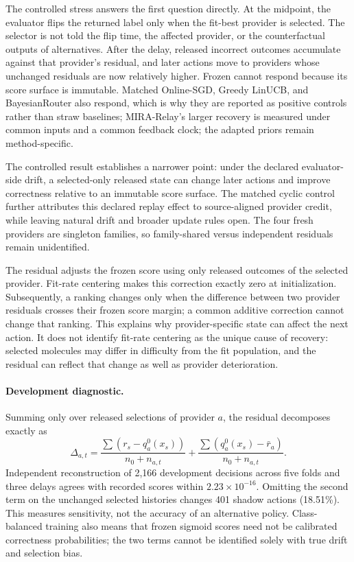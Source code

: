 \documentclass[sigconf,anonymous]{aamas}
\begin{document}
The controlled stress answers the first question directly. At the midpoint, the evaluator flips the returned label only when the fit-best provider is selected. The selector is not told the flip time, the affected provider, or the counterfactual outputs of alternatives. After the delay, released incorrect outcomes accumulate against that provider's residual, and later actions move to providers whose unchanged residuals are now relatively higher. Frozen cannot respond because its score surface is immutable. Matched Online-SGD, Greedy LinUCB, and BayesianRouter also respond, which is why they are reported as positive controls rather than straw baselines; MIRA-Relay's larger recovery is measured under common inputs and a common feedback clock; the adapted priors remain method-specific.

The controlled result establishes a narrower point: under the declared evaluator-side drift, a selected-only released state can change later actions and improve correctness relative to an immutable score surface. The matched cyclic control further attributes this declared replay effect to source-aligned provider credit, while leaving natural drift and broader update rules open. The four fresh providers are singleton families, so family-shared versus independent residuals remain unidentified.

The residual adjusts the frozen score using only released outcomes of the selected provider. Fit-rate centering makes this correction exactly zero at initialization. Subsequently, a ranking changes only when the difference between two provider residuals crosses their frozen score margin; a common additive correction cannot change that ranking. This explains why provider-specific state can affect the next action. It does not identify fit-rate centering as the unique cause of recovery: selected molecules may differ in difficulty from the fit population, and the residual can reflect that change as well as provider deterioration.

\paragraph{Development diagnostic.}
Summing only over released selections of provider $a$, the residual decomposes exactly as
\begin{equation}
\Delta_{a,t}=\frac{\sum(r_s-q_a^0(x_s))}{n_0+n_{a,t}}
            +\frac{\sum(q_a^0(x_s)-\bar r_a)}{n_0+n_{a,t}}.
\end{equation}
Independent reconstruction of 2,166 development decisions across five folds and three delays agrees with recorded scores within $2.23\times10^{-16}$. Omitting the second term on the unchanged selected histories changes 401 shadow actions (18.51\%). This measures sensitivity, not the accuracy of an alternative policy. Class-balanced training also means that frozen sigmoid scores need not be calibrated correctness probabilities; the two terms cannot be identified solely with true drift and selection bias.
\end{document}
